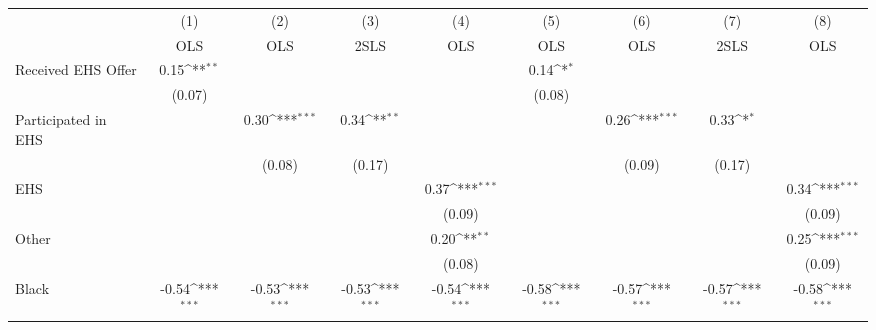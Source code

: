 {
\def\sym#1{\ifmmode^{#1}\else\(^{#1}\)\fi}
\begin{tabular}{l*{8}{c}}
\hline\hline
                    &\multicolumn{1}{c}{(1)}&\multicolumn{1}{c}{(2)}&\multicolumn{1}{c}{(3)}&\multicolumn{1}{c}{(4)}&\multicolumn{1}{c}{(5)}&\multicolumn{1}{c}{(6)}&\multicolumn{1}{c}{(7)}&\multicolumn{1}{c}{(8)}\\
                    &\multicolumn{1}{c}{OLS}&\multicolumn{1}{c}{OLS}&\multicolumn{1}{c}{2SLS}&\multicolumn{1}{c}{OLS}&\multicolumn{1}{c}{OLS}&\multicolumn{1}{c}{OLS}&\multicolumn{1}{c}{2SLS}&\multicolumn{1}{c}{OLS}\\
\hline
Received EHS Offer  &        0.15\sym{**} &                     &                     &                     &        0.14\sym{*}  &                     &                     &                     \\
                    &      (0.07)         &                     &                     &                     &      (0.08)         &                     &                     &                     \\
[1em]
Participated in EHS &                     &        0.30\sym{***}&        0.34\sym{**} &                     &                     &        0.26\sym{***}&        0.33\sym{*}  &                     \\
                    &                     &      (0.08)         &      (0.17)         &                     &                     &      (0.09)         &      (0.17)         &                     \\
[1em]
EHS                 &                     &                     &                     &        0.37\sym{***}&                     &                     &                     &        0.34\sym{***}\\
                    &                     &                     &                     &      (0.09)         &                     &                     &                     &      (0.09)         \\
[1em]
Other               &                     &                     &                     &        0.20\sym{**} &                     &                     &                     &        0.25\sym{***}\\
                    &                     &                     &                     &      (0.08)         &                     &                     &                     &      (0.09)         \\
[1em]
Black               &       -0.54\sym{***}&       -0.53\sym{***}&       -0.53\sym{***}&       -0.54\sym{***}&       -0.58\sym{***}&       -0.57\sym{***}&       -0.57\sym{***}&       -0.58\sym{***}\\

\end{tabular}}

